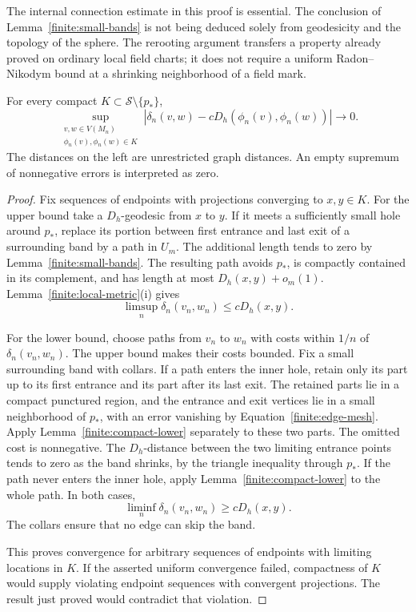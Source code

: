 \begin{remark}
\label{finite:band-input}
The internal connection estimate in this proof is essential.
The conclusion of Lemma~\ref{finite:small-bands} is not being
deduced solely from geodesicity and the topology of the sphere.
The rerooting argument transfers a property already proved on
ordinary local field charts; it does not require a uniform
Radon--Nikodym bound at a shrinking neighborhood of a field mark.
\end{remark}

\begin{proposition}
\label{finite:punctured}
For every compact \(K\subset\mathcal S\setminus\{p_*\}\),
\[
 \sup_{\substack{v,w\in V(M_n)\\
                 \phi_n(v),\phi_n(w)\in K}}
 \left|\delta_n(v,w)-cD_h(\phi_n(v),\phi_n(w))\right|
                       \longrightarrow0 .
\]
The distances on the left are unrestricted graph distances.
An empty supremum of nonnegative errors is interpreted as zero.
\end{proposition}

\begin{proof}
Fix sequences of endpoints with projections converging to
\(x,y\in K\).  For the upper bound take a \(D_h\)-geodesic from
\(x\) to \(y\).
If it meets a sufficiently small hole around \(p_*\), replace its
portion between first entrance and last exit of a surrounding
band by a path in \(U_m\).  The additional length tends to zero
by Lemma~\ref{finite:small-bands}.  The resulting path avoids
\(p_*\), is compactly contained in its complement, and has length
at most \(D_h(x,y)+o_m(1)\).
Lemma~\ref{finite:local-metric}(i) gives
\[
            \limsup_n\delta_n(v_n,w_n)\le cD_h(x,y).
\]

For the lower bound, choose paths from \(v_n\) to \(w_n\) with
costs within \(1/n\) of \(\delta_n(v_n,w_n)\).
The upper bound makes their costs bounded.
Fix a small surrounding band with collars.  If a path enters
the inner hole, retain only its part up to its first entrance
and its part after its last exit.  The retained parts lie in a
compact punctured region, and the entrance and exit vertices
lie in a small neighborhood of \(p_*\), with an error vanishing
by Equation~\eqref{finite:edge-mesh}.
Apply Lemma~\ref{finite:compact-lower} separately to these two
parts.  The omitted cost is nonnegative.  The \(D_h\)-distance
between the two limiting entrance points tends to zero as the
band shrinks, by the triangle inequality through \(p_*\).
If the path never enters the inner hole, apply
Lemma~\ref{finite:compact-lower} to the whole path.
In both cases,
\[
           \liminf_n\delta_n(v_n,w_n)\ge cD_h(x,y).
\]
The collars ensure that no edge can skip the band.

This proves convergence for arbitrary sequences of endpoints
with limiting locations in \(K\).  If the asserted uniform
convergence failed, compactness of \(K\) would supply violating
endpoint sequences with convergent projections.  The result
just proved would contradict that violation.
\end{proof}

